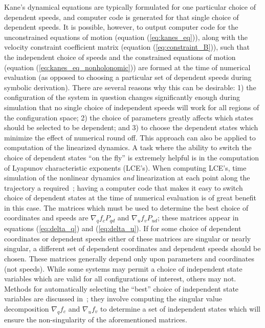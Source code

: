 Kane's dynamical equations are typically formulated for one particular choice
of dependent speeds, and computer code is generated for that single choice of
dependent speeds. It is possible, however, to output computer code for the
unconstrained equations of motion (equation (\ref{eq:kanes_eq})), along with
the velocity constraint coefficient matrix (equation (\ref{eq:constraint_B})),
such that the independent choice of speeds and the constrained equations of
motion (equation (\ref{eq:kanes_eq_nonholonomic})) are formed at the time of
numerical evaluation (as opposed to choosing a particular set of dependent
speeds during symbolic derivation). There are several reasons why this can be
desirable: 1) the configuration of the system in question changes significantly
enough during simulation that no single choice of independent speeds will work
for all regions of the configuration space; 2) the choice of parameters greatly
affects which states should be selected to be dependent; and 3) to choose the
dependent states which minimize the effect of numerical round off. This
approach can also be applied to computation of the linearized dynamics. A task
where the ability to switch the choice of dependent states ``on the fly'' is
extremely helpful is in the computation of Lyapunov characteristic exponents
(LCE's). When computing LCE's, time simulation of the nonlinear dynamics
\textit{and} linearization at each point along the trajectory a
required~\cite{Benettin1980a,Benettin1980b,Udwadia2001}; having a computer code
that makes it easy to switch choice of dependent states at the time of
numerical evaluation is of great benefit in this case. The matrices which must
be used to determine the best choice of coordinates and speeds are $\nabla_{q}
f_c P_{qd}$ and $\nabla_{u} f_v P_{ud}$; these matrices appear in equations
(\ref{eq:delta_q}) and (\ref{eq:delta_u}).  If for some choice of dependent
coordinates or dependent speeds either of these matrices are singular or nearly
singular, a different set of dependent coordinates and dependent speeds should
be chosen. These matrices generally depend only upon parameters and coordinates
(not speeds). While some systems may permit a choice of independent state
variables which are valid for all configurations of interest, others may not.
Methods for automatically selecting the ``best'' choice of independent state
variables are discussed in~\cite{Reckdahl1996}; they involve computing the
singular value decomposition $\nabla_q f_c$ and $\nabla_u f_v$ to determine a
set of independent states which will ensure the non-singularity of the
aforementioned matrices.

